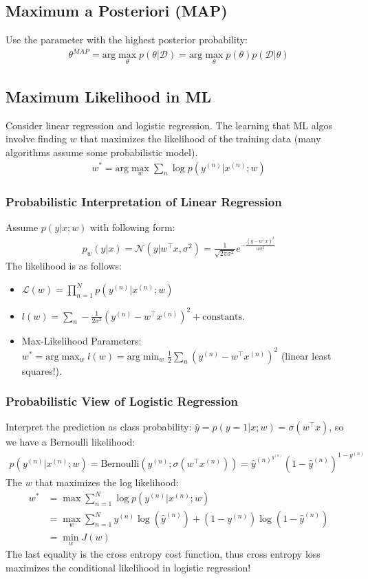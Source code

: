 \documentclass{article}
\newcommand{\argmax}{\text{arg}\max}
\newcommand{\argmin}{\text{arg}\min}
\begin{document}
\subsection{Maximum a Posteriori (MAP)}
Use the parameter with the highest posterior probability:
\begin{align}
    \theta^{MAP} = \text{arg}\max_\theta p(\theta|\mathcal{D}) = \text{arg}\max_\theta p(\theta)p(\mathcal{D}|\theta)
\end{align}
\subsection{Maximum Likelihood in ML}
Consider linear regression and logistic regression. The learning that ML algos involve finding $w$ that maximizes the likelihood of the training data (many algorithms assume some probabilistic model).
\begin{align}
    w^* = \argmax_w\sum_n\log p(y^{(n)} | x^{(n)}; w)
\end{align}
\subsubsection{Probabilistic Interpretation of Linear Regression}
Assume $p(y|x;w)$ with following form:
\begin{align}
    p_w(y|x) = \mathcal{N}(y|w^\top x, \sigma^2) = \frac{1}{\sqrt{2\pi \sigma^2}}e^{-\frac{(y-w^\top x)^2}{w\sigma^2}}
\end{align}
The likelihood is as follows:
\begin{itemize}
    \item $\mathcal{L}(w) = \prod_{n=1}^N p(y^{(n)}| x^{(n)};w)$
    \item $l(w) = \sum_n -\frac{1}{2\sigma^2}(y^{(n)} - w^\top x^{(n)})^2 + \text{constants}$.
    \item Max-Likelihood Parameters: $w^* = \argmax_wl(w) = \argmin_w \frac{1}{2}\sum_n(y^{(n)} - w^\top x^{(n)})^2$ (linear least squares!).
\end{itemize}
\subsubsection{Probabilistic View of Logistic Regression}
Interpret the prediction as class probability: $\hat{y} = p(y=1|x;w) = \sigma(w^\top x)$, so we have a Bernoulli likelihood:
\begin{align}
    p(y^{(n)}|x^{(n)};w) = \text{Bernoulli}(y^{(n)};\sigma(w^\top x^{(n)})) = \hat{y}^{(n)^{y^{(n)}}}(1-\hat{y}^{(n)})^{1-y^{(n)}}
\end{align}
The $w$ that maximizes the log likelihood:
\begin{align}
    w^* &= \max\sum_{n=1}^N\log p(y^{(n)}|x^{(n)};w)\\
    &= \max_w \sum_{n=1}^N y^{(n)}\log(\hat{y}^{(n)}) + (1-y^{(n)})\log(1-\hat{y}^{(n)})\\
    &= \min_wJ(w)
\end{align}
The last equality is the cross entropy cost function, thus cross entropy loss maximizes the conditional likelihood in logistic regression!
\end{document}
